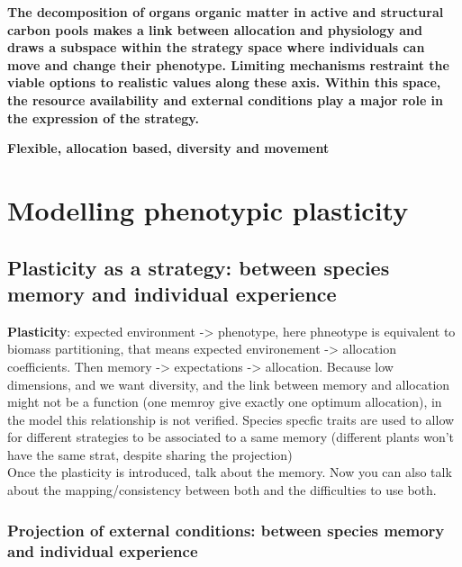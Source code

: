 

\textbf{The decomposition of organs organic matter in active and structural carbon pools makes a link between allocation and physiology and draws a subspace within the strategy space where individuals can move and change their phenotype. Limiting mechanisms restraint the viable options to realistic values along these axis. Within this space, the resource availability and external conditions play a major role in the expression of the strategy.\\ %
}


\textbf{Flexible, allocation based, diversity and movement}

\chapter{Modelling phenotypic plasticity}


\section{Plasticity as a strategy: between species memory and individual experience}

\textbf{Plasticity}: expected environment -> phenotype, here phneotype is equivalent to biomass partitioning, that means expected environement -> allocation coefficients. Then memory -> expectations -> allocation. Because low dimensions, and we want diversity, and the link between memory and allocation might not be a function (one memroy give exactly one optimum allocation), in the model this relationship is not verified. Species specfic traits are used to allow for different strategies to be associated to a same memory (different plants won't have the same strat, despite sharing the projection)\\
Once the plasticity is introduced, talk about the memory. Now you can also talk about the mapping/consistency between both and the difficulties to use both.


\subsection{Projection of external conditions: between species memory and individual experience}

